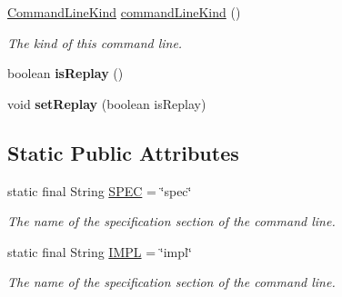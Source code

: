 \begin{DoxyCompactItemize}
\item 
\hyperlink{enumedu_1_1udel_1_1cis_1_1vsl_1_1civl_1_1run_1_1IF_1_1CommandLine_1_1CommandLineKind}{Command\+Line\+Kind} \hyperlink{classedu_1_1udel_1_1cis_1_1vsl_1_1civl_1_1run_1_1common_1_1CompareCommandLine_a1ba1f2345a6aafd671c0ec12779c6df3}{command\+Line\+Kind} ()
\begin{DoxyCompactList}\small\item\em The kind of this command line. \end{DoxyCompactList}\item 
\hypertarget{classedu_1_1udel_1_1cis_1_1vsl_1_1civl_1_1run_1_1common_1_1CompareCommandLine_ae01a0b962bd281d002d401e0aebbe0be}{}boolean {\bfseries is\+Replay} ()\label{classedu_1_1udel_1_1cis_1_1vsl_1_1civl_1_1run_1_1common_1_1CompareCommandLine_ae01a0b962bd281d002d401e0aebbe0be}

\item 
\hypertarget{classedu_1_1udel_1_1cis_1_1vsl_1_1civl_1_1run_1_1common_1_1CompareCommandLine_abee9adeb316d50a88eb2e613ab3561c6}{}void {\bfseries set\+Replay} (boolean is\+Replay)\label{classedu_1_1udel_1_1cis_1_1vsl_1_1civl_1_1run_1_1common_1_1CompareCommandLine_abee9adeb316d50a88eb2e613ab3561c6}

\end{DoxyCompactItemize}
\subsection*{Static Public Attributes}
\begin{DoxyCompactItemize}
\item 
\hypertarget{classedu_1_1udel_1_1cis_1_1vsl_1_1civl_1_1run_1_1common_1_1CompareCommandLine_a89e027254cb01d491732689400e5ef82}{}static final String \hyperlink{classedu_1_1udel_1_1cis_1_1vsl_1_1civl_1_1run_1_1common_1_1CompareCommandLine_a89e027254cb01d491732689400e5ef82}{S\+P\+E\+C} = \char`\"{}spec\char`\"{}\label{classedu_1_1udel_1_1cis_1_1vsl_1_1civl_1_1run_1_1common_1_1CompareCommandLine_a89e027254cb01d491732689400e5ef82}

\begin{DoxyCompactList}\small\item\em The name of the specification section of the command line. \end{DoxyCompactList}\item 
\hypertarget{classedu_1_1udel_1_1cis_1_1vsl_1_1civl_1_1run_1_1common_1_1CompareCommandLine_ac083109ed42d5b9d10b072db09a50894}{}static final String \hyperlink{classedu_1_1udel_1_1cis_1_1vsl_1_1civl_1_1run_1_1common_1_1CompareCommandLine_ac083109ed42d5b9d10b072db09a50894}{I\+M\+P\+L} = \char`\"{}impl\char`\"{}\label{classedu_1_1udel_1_1cis_1_1vsl_1_1civl_1_1run_1_1common_1_1CompareCommandLine_ac083109ed42d5b9d10b072db09a50894}

\begin{DoxyCompactList}\small\item\em The name of the specification section of the command line. \end{DoxyCompactList}\end{DoxyCompactItemize}
